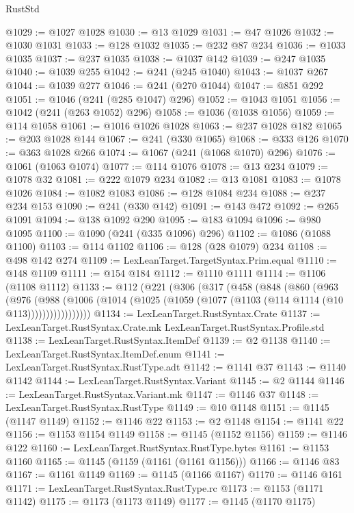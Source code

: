\begin{lexlean}{RustStd}
\begin{coremodule}
@1029 := @1027 @1028
@1030 := @13 @1029
@1031 := @47 @1026
@1032 := @1030 @1031
@1033 := @128 @1032
@1035 := @232 @87 @234
@1036 := @1033 @1035
@1037 := @237 @1035
@1038 := @1037 @142
@1039 := @247 @1035
@1040 := @1039 @255
@1042 := @241 (@245 @1040)
@1043 := @1037 @267
@1044 := @1039 @277
@1046 := @241 (@270 @1044)
@1047 := @851 @292
@1051 := @1046 (@241 (@285 @1047) @296)
@1052 := @1043 @1051
@1056 := @1042 (@241 (@263 @1052) @296)
@1058 := @1036 (@1038 @1056)
@1059 := @114 @1058
@1061 := @1016 @1026 @1028
@1063 := @237 @1028 @182
@1065 := @203 @1028 @144
@1067 := @241 (@330 @1065)
@1068 := @333 @126
@1070 := @363 @1028 @266
@1074 := @1067 (@241 (@1068 @1070) @296)
@1076 := @1061 (@1063 @1074)
@1077 := @114 @1076
@1078 := @13 @234
@1079 := @1078 @32
@1081 := @222 @1079 @234
@1082 := @13 @1081
@1083 := @1078 @1026
@1084 := @1082 @1083
@1086 := @128 @1084 @234
@1088 := @237 @234 @153
@1090 := @241 (@330 @142)
@1091 := @143 @472
@1092 := @265 @1091
@1094 := @138 @1092 @290
@1095 := @183 @1094
@1096 := @980 @1095
@1100 := @1090 (@241 (@335 @1096) @296)
@1102 := @1086 (@1088 @1100)
@1103 := @114 @1102
@1106 := @128 (@28 @1079) @234
@1108 := @498 @142 @274
@1109 := LexLeanTarget.TargetSyntax.Prim.equal
@1110 := @148 @1109
@1111 := @154 @184
@1112 := @1110 @1111
@1114 := @1106 (@1108 @1112)
@1133 := @112
    (@221
      (@306
        (@317
          (@458
            (@848
              (@860
                (@963
                  (@976
                    (@988
                      (@1006
                        (@1014 (@1025 (@1059 (@1077 (@1103 (@114 @1114 (@10 @113)))))))))))))))))
@1134 := LexLeanTarget.RustSyntax.Crate
@1137 := LexLeanTarget.RustSyntax.Crate.mk LexLeanTarget.RustSyntax.Profile.std
@1138 := LexLeanTarget.RustSyntax.ItemDef
@1139 := @2 @1138
@1140 := LexLeanTarget.RustSyntax.ItemDef.enum
@1141 := LexLeanTarget.RustSyntax.RustType.adt
@1142 := @1141 @37
@1143 := @1140 @1142
@1144 := LexLeanTarget.RustSyntax.Variant
@1145 := @2 @1144
@1146 := LexLeanTarget.RustSyntax.Variant.mk
@1147 := @1146 @37
@1148 := LexLeanTarget.RustSyntax.RustType
@1149 := @10 @1148
@1151 := @1145 (@1147 @1149)
@1152 := @1146 @22
@1153 := @2 @1148
@1154 := @1141 @22
@1156 := @1153 @1154 @1149
@1158 := @1145 (@1152 @1156)
@1159 := @1146 @122
@1160 := LexLeanTarget.RustSyntax.RustType.bytes
@1161 := @1153 @1160
@1165 := @1145 (@1159 (@1161 (@1161 @1156)))
@1166 := @1146 @83
@1167 := @1161 @1149
@1169 := @1145 (@1166 @1167)
@1170 := @1146 @161
@1171 := LexLeanTarget.RustSyntax.RustType.rc
@1173 := @1153 (@1171 @1142)
@1175 := @1173 (@1173 @1149)
@1177 := @1145 (@1170 @1175)

\end{coremodule}
\end{lexlean}
